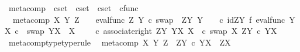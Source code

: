 \begin{isabellebody}
\isanewline
{}\isamarkupfalse%
%
\endisatagproof
{\isafoldproof}%
%
\isadelimproof
%
\endisadelimproof
%
\isadelimdocument
%
\endisadelimdocument
%
\isatagdocument
%
\isamarkuptrue%
%
\endisatagdocument
{\isafolddocument}%
%
\isadelimdocument
%
\endisadelimdocument
{}\isamarkupfalse%
\ meta{\isacharunderscore}{\kern0pt}comp\ {\isacharcolon}{\kern0pt}{\isacharcolon}{\kern0pt}\ {\isachardoublequoteopen}cset\ {\isasymRightarrow}\ cset\ {\isasymRightarrow}\ cset\ {\isasymRightarrow}\ cfunc{\isachardoublequoteclose}\ \ \ \isanewline
\ \ {\isachardoublequoteopen}meta{\isacharunderscore}{\kern0pt}comp\ X\ Y\ Z\ \ {\isacharequal}{\kern0pt}\ \ {\isacharparenleft}{\kern0pt}eval{\isacharunderscore}{\kern0pt}func\ Z\ Y\ {\isasymcirc}\isactrlsub c\ swap\ \ {\isacharparenleft}{\kern0pt}Z\isactrlbsup Y\isactrlesup {\isacharparenright}{\kern0pt}\ Y\ \ \ \ {\isasymcirc}\isactrlsub c\ {\isacharparenleft}{\kern0pt}id{\isacharparenleft}{\kern0pt}Z\isactrlbsup Y\isactrlesup {\isacharparenright}{\kern0pt}\ {\isasymtimes}\isactrlsub f\ {\isacharparenleft}{\kern0pt}eval{\isacharunderscore}{\kern0pt}func\ Y\ X\ {\isasymcirc}\isactrlsub c\ \ swap\ {\isacharparenleft}{\kern0pt}Y\isactrlbsup X\isactrlesup {\isacharparenright}{\kern0pt}\ \ X\ {\isacharparenright}{\kern0pt}\ \ {\isacharparenright}{\kern0pt}\ \ {\isasymcirc}\isactrlsub c\ {\isacharparenleft}{\kern0pt}associate{\isacharunderscore}{\kern0pt}right\ {\isacharparenleft}{\kern0pt}Z\isactrlbsup Y\isactrlesup {\isacharparenright}{\kern0pt}\ {\isacharparenleft}{\kern0pt}Y\isactrlbsup X\isactrlesup {\isacharparenright}{\kern0pt}\ X{\isacharparenright}{\kern0pt}\ \ {\isasymcirc}\isactrlsub c\ swap\ X\ {\isacharparenleft}{\kern0pt}{\isacharparenleft}{\kern0pt}Z\isactrlbsup Y\isactrlesup {\isacharparenright}{\kern0pt}\ {\isasymtimes}\isactrlsub c\ {\isacharparenleft}{\kern0pt}Y\isactrlbsup X\isactrlesup {\isacharparenright}{\kern0pt}{\isacharparenright}{\kern0pt}\ {\isacharparenright}{\kern0pt}\isactrlsup {\isasymsharp}\ {\isachardoublequoteclose}\isanewline
\isanewline
{}\isamarkupfalse%
\ meta{\isacharunderscore}{\kern0pt}comp{\isacharunderscore}{\kern0pt}type{\isacharbrackleft}{\kern0pt}type{\isacharunderscore}{\kern0pt}rule{\isacharbrackright}{\kern0pt}{\isacharcolon}{\kern0pt}\isanewline
\ \ {\isachardoublequoteopen}meta{\isacharunderscore}{\kern0pt}comp\ X\ Y\ Z\ {\isacharcolon}{\kern0pt}\ Z\isactrlbsup Y\isactrlesup \ {\isasymtimes}\isactrlsub c\ Y\isactrlbsup X\isactrlesup \ {\isasymrightarrow}\ Z\isactrlbsup X\isactrlesup {\isachardoublequoteclose}\isanewline

\end{isabellebody}
